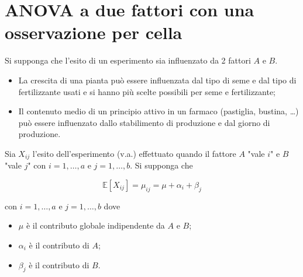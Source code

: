 \documentclass[hidelinks, 10pt]{article}
\begin{document}
\begin{center}
\begin{figure}[H]
\end{figure}
\end{center}

\section{ANOVA a due fattori con una osservazione per cella}
Si supponga che l'esito di un esperimento sia influenzato da 2 fattori $ A $ e $ B $.

\begin{es}
\noindent
\begin{itemize}
\item La crescita di una pianta pu\`o essere influenzata dal tipo di seme e dal tipo di fertilizzante usati e si hanno pi\`u scelte possibili per seme e fertilizzante;
\item Il contenuto medio di un principio attivo in un farmaco (pastiglia, bustina, \ldots) pu\`o essere influenzato dallo stabilimento di produzione e dal giorno di produzione.
\end{itemize}
\end{es}

Sia $ X_{ij} $ l'esito dell'esperimento (v.a.) effettuato quando il fattore $ A $ "vale $ i $" e $ B $ "vale $ j $" con $ i = 1, \dotsc, a $ e $ j = 1, \dotsc, b $. Si supponga che

\[ \mathbb{E}[X_{ij}] = \mu_{ij} = \mu + \alpha_{i} + \beta_{j} \]

con $ i = 1, \dotsc, a $ e $ j = 1, \dotsc, b $ dove

\begin{itemize}
\item $ \mu $ \`e il contributo globale indipendente da $ A $ e $ B $;
\item $ \alpha_{i} $ \`e il contributo di $ A $;
\item $ \beta_{j} $ \`e il contributo di $ B $.
\end{itemize}
\end{document}
